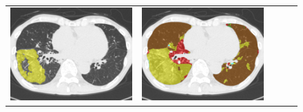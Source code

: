 \begin{figure}[htbp]
\begin{tabular}{ccccc}
    \begin{minipage}[c]{.21\textwidth}
      \centering
      \includegraphics[width=1\textwidth]{images/median/truth/2_1134_20090216_3_145.png}
    \end{minipage} &
    \begin{minipage}[c]{.21\textwidth}
      \centering
      \includegraphics[width=1\textwidth]{images/median/alpha0/2_1134_20090216_3_145.png}
    \end{minipage} &
    \begin{minipage}[c]{.21\textwidth}
      \centering

\end{minipage}
\end{tabular}
\end{figure}
